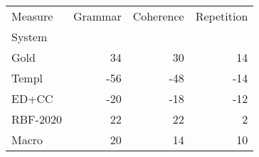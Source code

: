 \begin{tabular}{lrrr}
\toprule
Measure & Grammar & Coherence & Repetition \\
System &  &  &  \\
\midrule
Gold & 34 & 30 & 14 \\
Templ & -56 & -48 & -14 \\
ED+CC & -20 & -18 & -12 \\
RBF-2020 & 22 & 22 & 2 \\
Macro & 20 & 14 & 10 \\
\bottomrule
\end{tabular}
